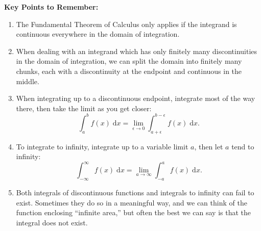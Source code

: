 \documentclass{article}
\newcommand{\diff}{\;\mathrm{d}}
\begin{document}
\clearpage





{\bf Key Points to Remember:}

\vspace{5mm}

\begin{enumerate}
	\item The Fundamental Theorem of Calculus only applies if the integrand is continuous everywhere in the domain of integration.
	\item When dealing with an integrand which has only finitely many discontinuities in the domain of integration, we can split the domain into finitely many chunks, each with a discontinuity at the endpoint and continuous in the middle.
	\item When integrating up to a discontinuous endpoint, integrate most of the way there, then take the limit as you get closer:
		\[\int_a^b f(x)\diff x = \lim_{\epsilon\to 0} \int_{a+\epsilon}^{b-\epsilon}f(x)\diff x.\]
	\item To integrate to infinity, integrate up to a variable limit $a$, then let $a$ tend to infinity:
		\[\int_{-\infty}^\infty f(x)\diff x = \lim_{a\to \infty}\int_{-a}^a f(x)\diff x.\]
	\item Both integrals of discontinuous functions and integrals to infinity can fail to exist. Sometimes they do so in a meaningful way, and we can think of the function enclosing ``infinite area,'' but often the best we can say is that the integral does not exist.
\end{enumerate}
\end{document}

